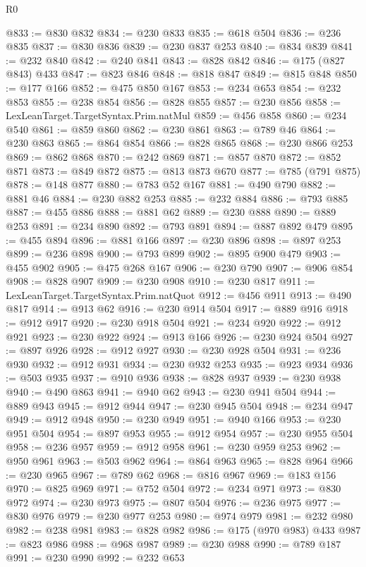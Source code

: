 \begin{lexlean}{R0}
\begin{coremodule}
@833 := @830 @832
@834 := @230 @833
@835 := @618 @504
@836 := @236 @835
@837 := @830 @836
@839 := @230 @837 @253
@840 := @834 @839
@841 := @232 @840
@842 := @240 @841
@843 := @828 @842
@846 := @175 (@827 @843) @433
@847 := @823 @846
@848 := @818 @847
@849 := @815 @848
@850 := @177 @166
@852 := @475 @850 @167
@853 := @234 @653
@854 := @232 @853
@855 := @238 @854
@856 := @828 @855
@857 := @230 @856
@858 := LexLeanTarget.TargetSyntax.Prim.natMul
@859 := @456 @858
@860 := @234 @540
@861 := @859 @860
@862 := @230 @861
@863 := @789 @46
@864 := @230 @863
@865 := @864 @854
@866 := @828 @865
@868 := @230 @866 @253
@869 := @862 @868
@870 := @242 @869
@871 := @857 @870
@872 := @852 @871
@873 := @849 @872
@875 := @813 @873 @670
@877 := @785 (@791 @875)
@878 := @148 @877
@880 := @783 @52 @167
@881 := @490 @790
@882 := @881 @46
@884 := @230 @882 @253
@885 := @232 @884
@886 := @793 @885
@887 := @455 @886
@888 := @881 @62
@889 := @230 @888
@890 := @889 @253
@891 := @234 @890
@892 := @793 @891
@894 := @887 @892 @479
@895 := @455 @894
@896 := @881 @166
@897 := @230 @896
@898 := @897 @253
@899 := @236 @898
@900 := @793 @899
@902 := @895 @900 @479
@903 := @455 @902
@905 := @475 @268 @167
@906 := @230 @790
@907 := @906 @854
@908 := @828 @907
@909 := @230 @908
@910 := @230 @817
@911 := LexLeanTarget.TargetSyntax.Prim.natQuot
@912 := @456 @911
@913 := @490 @817
@914 := @913 @62
@916 := @230 @914 @504
@917 := @889 @916
@918 := @912 @917
@920 := @230 @918 @504
@921 := @234 @920
@922 := @912 @921
@923 := @230 @922
@924 := @913 @166
@926 := @230 @924 @504
@927 := @897 @926
@928 := @912 @927
@930 := @230 @928 @504
@931 := @236 @930
@932 := @912 @931
@934 := @230 @932 @253
@935 := @923 @934
@936 := @503 @935
@937 := @910 @936
@938 := @828 @937
@939 := @230 @938
@940 := @490 @863
@941 := @940 @62
@943 := @230 @941 @504
@944 := @889 @943
@945 := @912 @944
@947 := @230 @945 @504
@948 := @234 @947
@949 := @912 @948
@950 := @230 @949
@951 := @940 @166
@953 := @230 @951 @504
@954 := @897 @953
@955 := @912 @954
@957 := @230 @955 @504
@958 := @236 @957
@959 := @912 @958
@961 := @230 @959 @253
@962 := @950 @961
@963 := @503 @962
@964 := @864 @963
@965 := @828 @964
@966 := @230 @965
@967 := @789 @62
@968 := @816 @967
@969 := @183 @156
@970 := @825 @969
@971 := @752 @504
@972 := @234 @971
@973 := @830 @972
@974 := @230 @973
@975 := @807 @504
@976 := @236 @975
@977 := @830 @976
@979 := @230 @977 @253
@980 := @974 @979
@981 := @232 @980
@982 := @238 @981
@983 := @828 @982
@986 := @175 (@970 @983) @433
@987 := @823 @986
@988 := @968 @987
@989 := @230 @988
@990 := @789 @187
@991 := @230 @990
@992 := @232 @653

\end{coremodule}
\end{lexlean}
